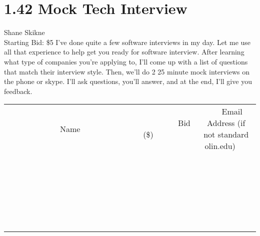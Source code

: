 \documentclass[11pt]{article}
\begin{document}
\section*{1.42 Mock Tech Interview}
Shane Skikne
\\
Starting Bid: \$5
\newline
I've done quite a few software interviews in my day. Let me use all that experience to help get you ready for software interview. After learning what type of companies you're applying to, I'll come up with a list of questions that match their interview style. Then, we'll do 2 25 minute mock interviews on the phone or skype. I'll ask questions, you'll answer, and at the end, I'll give you feedback.
\\[6ex]
\begin{tabular}{c c c}
~~~~~~~~~~~~~Name~~~~~~~~~~~~~ & ~~~~~~~~~Bid (\$)~~~~~~~~~  & ~~~Email Address (if not standard olin.edu)~~~\\
 & & \\
\hline
 & & \\
\hline
 & & \\
\hline
 & & \\
\hline
 & & \\
\hline
 & & \\
\hline
 & & \\
\hline
 & & \\
\hline
 & & \\
\hline
 & & \\
\hline
 & & \\
\hline
 & & \\
\hline
 & & \\
\hline
 & & \\
\hline
 & & \\
\hline
 & & \\
\hline
 & & \\
\hline
 & & \\
\hline
 & & \\
\hline
 & & \\
\hline
 & & \\
\hline
 & & \\
\hline
 & & \\
\hline
 & & \\
\hline
 & & \\
\hline
 & & \\
\hline
\end{tabular}
\newpage
\end{document}
